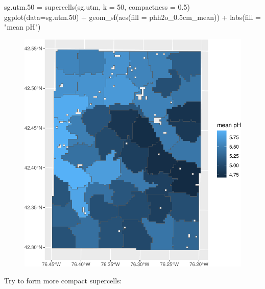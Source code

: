 \documentclass[
  letterpaper,
  DIV=11,
  numbers=noendperiod]{scrartcl}
\newenvironment{Shaded}{\begin{snugshade}}{\end{snugshade}}
\newcommand{\AttributeTok}[1]{\textcolor[rgb]{0.40,0.45,0.13}{#1}}
\newcommand{\DecValTok}[1]{\textcolor[rgb]{0.68,0.00,0.00}{#1}}
\newcommand{\FloatTok}[1]{\textcolor[rgb]{0.68,0.00,0.00}{#1}}
\newcommand{\FunctionTok}[1]{\textcolor[rgb]{0.28,0.35,0.67}{#1}}
\newcommand{\NormalTok}[1]{\textcolor[rgb]{0.00,0.23,0.31}{#1}}
\newcommand{\OtherTok}[1]{\textcolor[rgb]{0.00,0.23,0.31}{#1}}
\newcommand{\SpecialCharTok}[1]{\textcolor[rgb]{0.37,0.37,0.37}{#1}}
\newcommand{\StringTok}[1]{\textcolor[rgb]{0.13,0.47,0.30}{#1}}
\begin{document}
\begin{Shaded}
\begin{Highlighting}[]
\NormalTok{sg.utm}\FloatTok{.50} \OtherTok{=} \FunctionTok{supercells}\NormalTok{(sg.utm, }\AttributeTok{k =} \DecValTok{50}\NormalTok{, }\AttributeTok{compactness =} \FloatTok{0.5}\NormalTok{)}
\FunctionTok{ggplot}\NormalTok{(}\AttributeTok{data=}\NormalTok{sg.utm}\FloatTok{.50}\NormalTok{) }\SpecialCharTok{+}
  \FunctionTok{geom\_sf}\NormalTok{(}\FunctionTok{aes}\NormalTok{(}\AttributeTok{fill =}\NormalTok{ phh2o\_0}\FloatTok{.5}\NormalTok{cm\_mean)) }\SpecialCharTok{+}
  \FunctionTok{labs}\NormalTok{(}\AttributeTok{fill =} \StringTok{"mean pH"}\NormalTok{)}
\end{Highlighting}
\end{Shaded}

\begin{figure}[H]

{\centering \includegraphics{PatternAnalysisWorkshopTutorial_files/figure-pdf/supercells-not-compact-1.pdf}

}

\end{figure}

Try to form more compact supercells:
\end{document}
